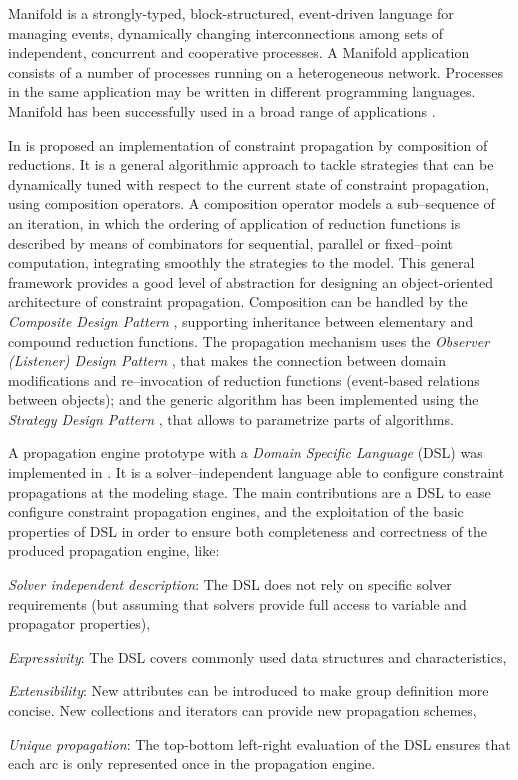 {\sc Manifold} is a strongly-typed, block-structured, event-driven language for managing events, dynamically changing interconnections among sets of independent, concurrent and cooperative processes. A {\sc Manifold} application consists of a number of processes running on a heterogeneous network. Processes in the same application may be written in different programming languages. {\sc Manifold} has been successfully used in a broad range of applications \cite{Arbab1995}.

In \cite{Granvilliers2001} is proposed an implementation of constraint propagation by composition of reductions. It is a general algorithmic approach to tackle strategies that can be dynamically tuned with respect to the current state of constraint propagation, using composition operators. A composition operator models a sub--sequence of an iteration, in which the ordering of application of reduction functions is described by means of combinators for sequential, parallel or fixed--point computation, integrating smoothly the strategies to the model. This general framework provides a good level of abstraction for designing an object-oriented architecture of constraint propagation. Composition can be handled by the {\it Composite Design Pattern} \cite{DP_Composite}, supporting inheritance between elementary and compound reduction functions. The propagation mechanism uses the {\it Observer (Listener) Design Pattern} \cite{DP_Observer}, that makes the connection between domain modifications and re--invocation of reduction functions (event-based relations between objects); and the generic algorithm has been implemented using the {\it Strategy Design Pattern} \cite{DP_Strategy}, that allows to parametrize parts of algorithms.

A propagation engine prototype with a \textit{Domain Specific Language} (DSL) was implemented in \cite{Prudhomme2013}. It is a solver--independent language able to configure constraint propagations at the modeling stage. The main contributions are a DSL to ease configure constraint propagation engines, and the exploitation of the basic properties of DSL in order to ensure both completeness and correctness of the produced propagation engine, like:	
\begin{inparaenum}[i)]%
	\item {\it Solver independent description}: The DSL does not rely on specific solver requirements (but assuming that solvers provide full access to variable and propagator properties), 
	\item {\it Expressivity}: The DSL covers commonly used data structures and characteristics, 
	\item {\it Extensibility}: New attributes can be introduced to make group definition more concise. New collections and iterators can provide new propagation schemes, 
	\item {\it Unique propagation}: The top-bottom left-right evaluation of the DSL ensures that each arc is only represented once in the propagation engine.
\end{inparaenum}%

